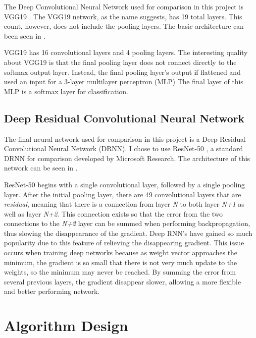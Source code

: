 \documentclass[12pt]{article}
\begin{document}
The Deep Convolutional Neural Network used for comparison in this project is VGG19 \cite{vgg}. The VGG19 network, as the name suggests, has 19 total layers. This count, however, does not include the pooling layers. The basic architecture can been seen in . 

VGG19 has 16 convolutional layers and 4 pooling layers. The interesting quality about VGG19 is that the final pooling layer does not connect directly to the softmax output layer. Instead, the final pooling layer's output if flattened and used an input for a 3-layer multilayer perceptron (MLP) \cite{ci_book} The final layer of this MLP is a softmax layer for classification. 

		\subsection{Deep Residual Convolutional Neural Network}

The final neural network used for comparison in this project is a Deep Residual Convolutional Neural Network (DRNN). I chose to use ResNet-50 \cite{resnet50}, a standard DRNN for comparison developed by Microsoft Research. The architecture of this network can be seen in .

ResNet-50 begins with a single convolutional layer, followed by a single pooling layer. After the initial pooling layer, there are 49 convolutional layers that are \textit{residual}, meaning that there is a connection from layer \textit{N} to both layer \textit{N+1} as well as layer \textit{N+2}. This connection exists so that the error from the two connections to the \textit{N+2} layer can be summed when performing backpropagation, thus slowing the disappearance of the gradient. Deep RNN's have gained so much popularity due to this feature of relieving the disappearing gradient. This issue occurs when training deep networks because as weight vector approaches the minimum, the gradient is so small that there is not very much update to the weights, so the minimum may never be reached. By summing the error from several previous layers, the gradient disappear slower, allowing a more flexible and better performing network. 
	
	\section{Algorithm Design}
	
\end{document}
